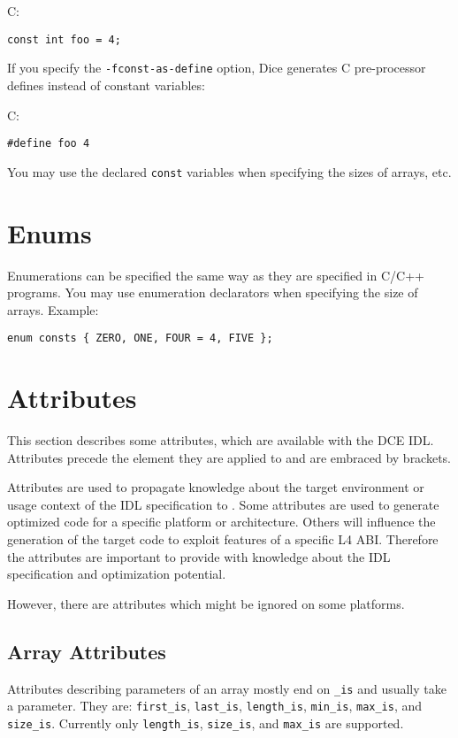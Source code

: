 C:
\begin{verbatim}
const int foo = 4;
\end{verbatim}

If you specify the {\tt -fconst-as-define} option, Dice generates C
pre-processor defines instead of constant variables:

C:
\begin{verbatim}
#define foo 4
\end{verbatim}

You may use the declared {\tt const} variables when specifying the sizes of
arrays, etc.

\section{Enums}

Enumerations can be specified the same way as they are specified in C/C++
programs.  You may use enumeration declarators when specifying the size of
arrays.  Example:

\begin{verbatim}
enum consts { ZERO, ONE, FOUR = 4, FIVE };
\end{verbatim}

\section{Attributes}
\label{sec:attributes}

This section describes some attributes, which are available with the DCE IDL.
Attributes precede the element they are applied to and are embraced by
brackets.

Attributes are used to propagate knowledge about the target environment or
usage context of the IDL specification to \dice{}.  Some attributes are used
to generate optimized code for a specific platform or architecture. Others
will influence the generation of the target code to exploit features of a
specific L4 ABI. Therefore the attributes are important to provide \dice{}
with knowledge about the IDL specification and optimization potential.

However, there are attributes which might be ignored on some platforms.

\subsection{Array Attributes}
Attributes describing parameters of an array mostly end on
\verb|_is| and usually take a parameter. They are:
\verb|first_is|, \verb|last_is|, \verb|length_is|, \verb|min_is|,
\verb|max_is|, and \verb|size_is|. Currently only \verb|length_is|,
\verb|size_is|, and \verb|max_is| are supported.

